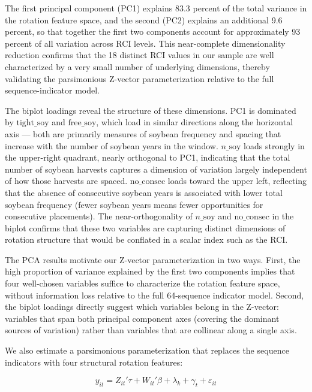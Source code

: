 \documentclass[11pt,letterpaper]{article}
\theoremstyle{remark}
\theoremstyle{plain}
\theoremstyle{definition}
\begin{document}
The first principal component (PC1) explains 83.3 percent of the total variance in the rotation feature space, and the second (PC2) explains an additional 9.6 percent, so that together the first two components account for approximately 93 percent of all variation across RCI levels. This near-complete dimensionality reduction confirms that the 18 distinct RCI values in our sample are well characterized by a very small number of underlying dimensions, thereby validating the parsimonious Z-vector parameterization relative to the full sequence-indicator model.

The biplot loadings reveal the structure of these dimensions. PC1 is dominated by $\text{tight\_soy}$ and $\text{free\_soy}$, which load in similar directions along the horizontal axis — both are primarily measures of soybean frequency and spacing that increase with the number of soybean years in the window. $n\_\text{soy}$ loads strongly in the upper-right quadrant, nearly orthogonal to PC1, indicating that the total number of soybean harvests captures a dimension of variation largely independent of how those harvests are spaced. $\text{no\_consec}$ loads toward the upper left, reflecting that the absence of consecutive soybean years is associated with lower total soybean frequency (fewer soybean years means fewer opportunities for consecutive placements). The near-orthogonality of $n\_\text{soy}$ and $\text{no\_consec}$ in the biplot confirms that these two variables are capturing distinct dimensions of rotation structure that would be conflated in a scalar index such as the RCI.

The PCA results motivate our Z-vector parameterization in two ways. First, the high proportion of variance explained by the first two components implies that four well-chosen variables suffice to characterize the rotation feature space, without information loss relative to the full 64-sequence indicator model. Second, the biplot loadings directly suggest which variables belong in the Z-vector: variables that span both principal component axes (covering the dominant sources of variation) rather than variables that are collinear along a single axis.

We also estimate a parsimonious parameterization that replaces the sequence indicators with four structural rotation features:

\begin{equation}
    y_{it}=Z_{it}'\tau+ W_{it}'\beta+\lambda_{k}+\gamma_{t}+\varepsilon_{it}
\end{equation}
\end{document}
